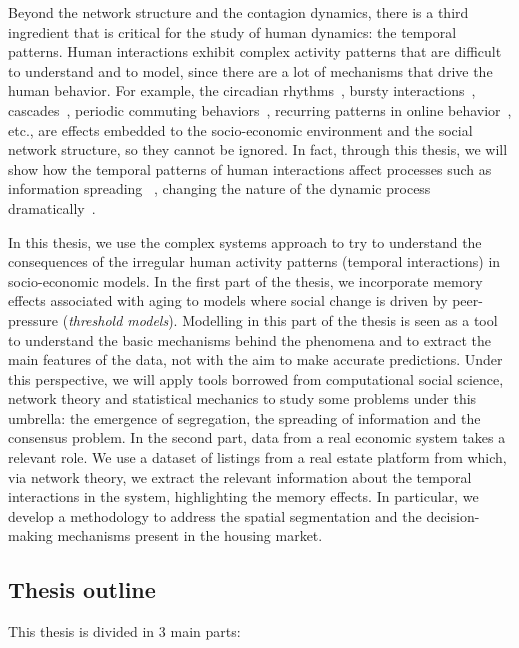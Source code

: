 Beyond the network structure and the contagion dynamics, there is a third ingredient that is critical for the study of human dynamics: the temporal patterns. Human interactions exhibit complex activity patterns that are difficult to understand and to model, since there are a lot of mechanisms that drive the human behavior. For example, the circadian rhythms~\cite{roenneberg-2013}, bursty interactions~\cite{Barabasi2005Bursts}, cascades~\cite{watts-2002}, periodic commuting behaviors~\cite{gonzalez2008understanding}, recurring patterns in online behavior~\cite{Lazer2009CompSocSci}, etc., are effects embedded to the socio-economic environment and the social network structure, so they cannot be ignored. In fact, through this thesis, we will show how the temporal patterns of human interactions affect processes such as information spreading ~\cite{Holme2012Temporal}, changing the nature of the dynamic process dramatically~\cite{karsai-2011}.

In this thesis, we use the complex systems approach to try to understand the consequences of the irregular human activity patterns (temporal interactions) in socio-economic models. In the first part of the thesis, we incorporate memory effects associated with aging to models where social change is driven by peer-pressure (\textit{threshold models}). Modelling in this part of the thesis is seen as a tool to understand the basic mechanisms behind the phenomena and to extract the main features of the data, not with the aim to make accurate predictions. Under this perspective, we will apply tools borrowed from computational social science, network theory and statistical mechanics to study some problems under this umbrella: the emergence of segregation, the spreading of information and the consensus problem. In the second part, data from a real economic system takes a relevant role. We use a dataset of listings from a real estate platform from which, via network theory, we extract the relevant information about the temporal interactions in the system, highlighting the memory effects. In particular, we develop a methodology to address the spatial segmentation and the decision-making mechanisms present in the housing market.

\subsection{\label{sec:Thesis outline} Thesis outline}

This thesis is divided in 3 main parts:

